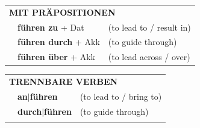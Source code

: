 \documentclass[10pt,a4paper]{revtex4-2}
\begin{document}
\begin{verbbox}
 \vspace{10pt}

\begin{tabular}{lll}
      \multicolumn{3}{l}{\textbf{MIT PRÄPOSITIONEN}}\\
& \textbf{führen zu} + Dat & (to lead to / result in)\\
& \textbf{führen durch} + Akk & (to guide through)\\
& \textbf{führen über} + Akk & (to lead across / over)\\
\end{tabular}
  \hfill
\begin{tabular}{lll}
      \multicolumn{3}{l}{\textbf{TRENNBARE VERBEN}}\\
 & \textbf{an$|$führen} & (to lead to / bring to)\\
 & \textbf{durch$|$führen} & (to guide through)\\
\vspace{10pt}
  \end{tabular}


\vspace{-5pt}
\end{verbbox}
\end{document}
